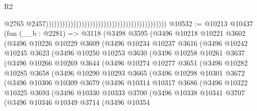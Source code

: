 \begin{lexlean}{R2}
\begin{coremodule}
                                                                                            @2765
                                                                                            @2457))))))))))))))))))))))))))))))))))))))))))))
@10532 := @10213
    @10437
    (fun (__b : @2281) =>
    @3118
      (@3498
        @3595
        (@3496
          @10218
          @10221
          @3602
          (@3496
            @10226
            @10229
            @3609
            (@3496
              @10234
              @10237
              @3616
              (@3496
                @10242
                @10245
                @3623
                (@3496
                  @10250
                  @10253
                  @3630
                  (@3496
                    @10258
                    @10261
                    @3637
                    (@3496
                      @10266
                      @10269
                      @3644
                      (@3496
                        @10274
                        @10277
                        @3651
                        (@3496
                          @10282
                          @10285
                          @3658
                          (@3496
                            @10290
                            @10293
                            @3665
                            (@3496
                              @10298
                              @10301
                              @3672
                              (@3496
                                @10306
                                @10309
                                @3679
                                (@3496
                                  @10314
                                  @10317
                                  @3686
                                  (@3496
                                    @10322
                                    @10325
                                    @3693
                                    (@3496
                                      @10330
                                      @10333
                                      @3700
                                      (@3496
                                        @10338
                                        @10341
                                        @3707
                                        (@3496
                                          @10346
                                          @10349
                                          @3714
                                          (@3496
                                            @10354

\end{coremodule}
\end{lexlean}
